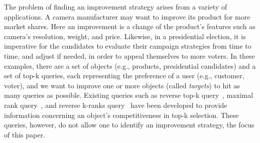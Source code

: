 The problem of finding an improvement strategy arises from a variety of applications. A camera manufacturer may want to improve its product for more market shares. Here an improvement is a change of the product's features such as camera's resolution, weight, and price. Likewise, in a presidential election, it is imperative for the candidates to evaluate their campaign strategies from time to time, and adjust if needed, in order to appeal themselves to more voters. In these examples, there are a set of objects (e.g., products, presidential candidates) and a set of top-k queries, each representing the preference of a user (e.g., customer, voter), and we want to improve one or more objects (called {\em targets}) to hit as many queries as possible. Existing queries such as reverse top-k query~\cite{vlachou2011monochromatic}, maximal rank query~\cite{mouratidis2015maximum}, and reverse k-ranks query~\cite{zhang2014reverse} have been developed to provide information concerning an object's competitiveness in top-k selection. These queries, however, do not allow one to identify an improvement strategy, the focus of this paper.

\iffalse
The little attention received by this problem is disproportionate to its prevalence. Whenever top-k queries are used to find objects that match users' preference, the problem of object improvement is naturally of interests. For example, a product seller naturally wants its products to be in as many users' query result as possible. In an election, a candidate's goal is to maximize the number of voters who prefers him over the other candidates. In all these examples, an object (e.g., a product, a candidate) has several attributes, and each of them can be adjusted to certain degree (e.g., price of a product, policies of a candidate). A set of top-k query is used to model users' preference, and the goal of the product owner is to attract as many users as possible. It is imperative to know how to make their product more competitive, but such information is not provided by any existing queries.
\fi


